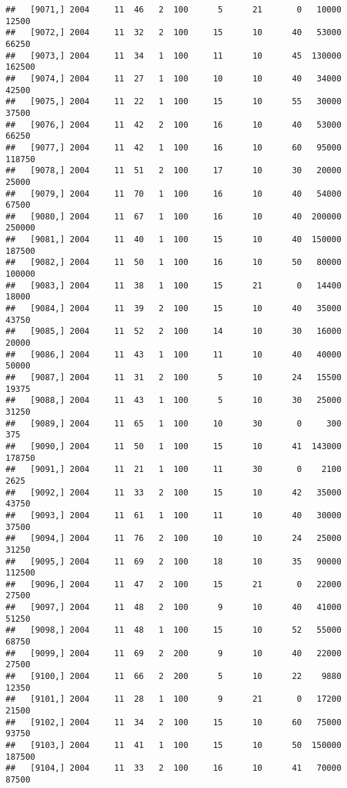 \documentclass{article}\usepackage[]{graphicx}\usepackage[]{color}
\makeatletter
\newenvironment{kframe}{%
 \def\at@end@of@kframe{}%
 \ifinner\ifhmode%
  \def\at@end@of@kframe{\end{minipage}}%
  \begin{minipage}{\columnwidth}%
 \fi\fi%
 \def\FrameCommand##1{\hskip\@totalleftmargin \hskip-\fboxsep
 \colorbox{shadecolor}{##1}\hskip-\fboxsep
     \hskip-\linewidth \hskip-\@totalleftmargin \hskip\columnwidth}%
 \MakeFramed {\advance\hsize-\width
   \@totalleftmargin\z@ \linewidth\hsize
   \@setminipage}}%
 {\par\unskip\endMakeFramed%
 \at@end@of@kframe}
\newenvironment{knitrout}{}{} %
\makeatother
\begin{document}
\begin{knitrout}
\begin{kframe}
\begin{verbatim}
##   [9071,] 2004     11  46   2  100      5      21       0   10000   12500
##   [9072,] 2004     11  32   2  100     15      10      40   53000   66250
##   [9073,] 2004     11  34   1  100     11      10      45  130000  162500
##   [9074,] 2004     11  27   1  100     10      10      40   34000   42500
##   [9075,] 2004     11  22   1  100     15      10      55   30000   37500
##   [9076,] 2004     11  42   2  100     16      10      40   53000   66250
##   [9077,] 2004     11  42   1  100     16      10      60   95000  118750
##   [9078,] 2004     11  51   2  100     17      10      30   20000   25000
##   [9079,] 2004     11  70   1  100     16      10      40   54000   67500
##   [9080,] 2004     11  67   1  100     16      10      40  200000  250000
##   [9081,] 2004     11  40   1  100     15      10      40  150000  187500
##   [9082,] 2004     11  50   1  100     16      10      50   80000  100000
##   [9083,] 2004     11  38   1  100     15      21       0   14400   18000
##   [9084,] 2004     11  39   2  100     15      10      40   35000   43750
##   [9085,] 2004     11  52   2  100     14      10      30   16000   20000
##   [9086,] 2004     11  43   1  100     11      10      40   40000   50000
##   [9087,] 2004     11  31   2  100      5      10      24   15500   19375
##   [9088,] 2004     11  43   1  100      5      10      30   25000   31250
##   [9089,] 2004     11  65   1  100     10      30       0     300     375
##   [9090,] 2004     11  50   1  100     15      10      41  143000  178750
##   [9091,] 2004     11  21   1  100     11      30       0    2100    2625
##   [9092,] 2004     11  33   2  100     15      10      42   35000   43750
##   [9093,] 2004     11  61   1  100     11      10      40   30000   37500
##   [9094,] 2004     11  76   2  100     10      10      24   25000   31250
##   [9095,] 2004     11  69   2  100     18      10      35   90000  112500
##   [9096,] 2004     11  47   2  100     15      21       0   22000   27500
##   [9097,] 2004     11  48   2  100      9      10      40   41000   51250
##   [9098,] 2004     11  48   1  100     15      10      52   55000   68750
##   [9099,] 2004     11  69   2  200      9      10      40   22000   27500
##   [9100,] 2004     11  66   2  200      5      10      22    9880   12350
##   [9101,] 2004     11  28   1  100      9      21       0   17200   21500
##   [9102,] 2004     11  34   2  100     15      10      60   75000   93750
##   [9103,] 2004     11  41   1  100     15      10      50  150000  187500
##   [9104,] 2004     11  33   2  100     16      10      41   70000   87500

\end{verbatim}
\end{kframe}
\end{knitrout}
\end{document}
